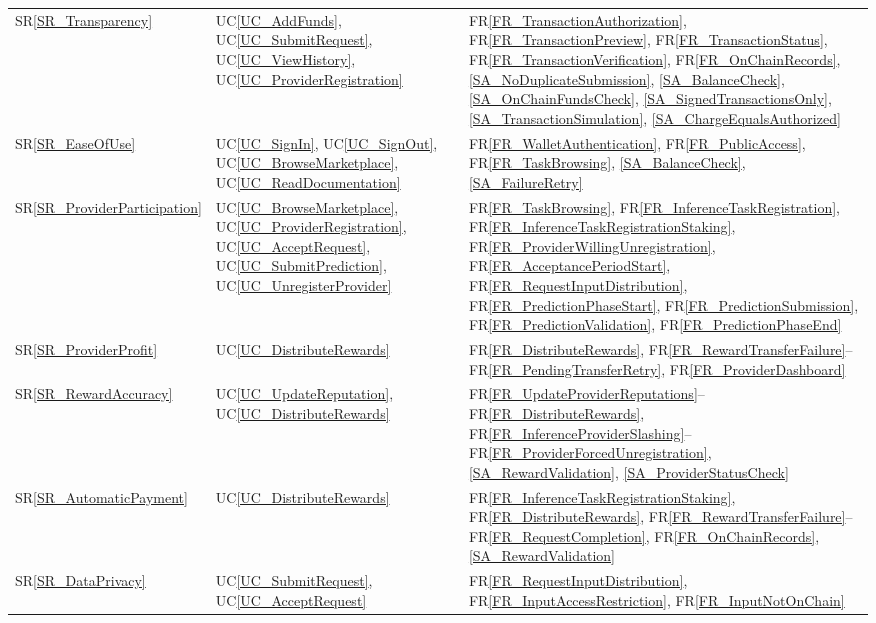 \documentclass[12pt]{article}
\newcommand{\srref}[1]{SR\ref{#1}}
\newcommand{\ucref}[1]{UC\ref{#1}}
\newcommand{\rref}[1]{FR\ref{#1}}
\begin{document}
\begin{longtable}{p{} p{} p{}}
\srref{SR_Transparency} & \ucref{UC_AddFunds}, \ucref{UC_SubmitRequest}, \ucref{UC_ViewHistory}, \ucref{UC_ProviderRegistration}
  & \rref{FR_TransactionAuthorization}, \rref{FR_TransactionPreview}, \rref{FR_TransactionStatus}, \rref{FR_TransactionVerification}, \rref{FR_OnChainRecords}, \ref{SA_NoDuplicateSubmission}, \ref{SA_BalanceCheck}, \ref{SA_OnChainFundsCheck}, \ref{SA_SignedTransactionsOnly}, \ref{SA_TransactionSimulation}, \ref{SA_ChargeEqualsAuthorized} \\[0.5em]

\srref{SR_EaseOfUse} & \ucref{UC_SignIn}, \ucref{UC_SignOut}, \ucref{UC_BrowseMarketplace}, \ucref{UC_ReadDocumentation}
  & \rref{FR_WalletAuthentication}, \rref{FR_PublicAccess}, \rref{FR_TaskBrowsing}, \ref{SA_BalanceCheck}, \ref{SA_FailureRetry} \\[0.5em]

\srref{SR_ProviderParticipation} & \ucref{UC_BrowseMarketplace}, \ucref{UC_ProviderRegistration}, \ucref{UC_AcceptRequest}, \ucref{UC_SubmitPrediction}, \ucref{UC_UnregisterProvider}
  & \rref{FR_TaskBrowsing}, \rref{FR_InferenceTaskRegistration}, \rref{FR_InferenceTaskRegistrationStaking}, \rref{FR_ProviderWillingUnregistration}, \rref{FR_AcceptancePeriodStart}, \rref{FR_RequestInputDistribution}, \rref{FR_PredictionPhaseStart}, \rref{FR_PredictionSubmission}, \rref{FR_PredictionValidation}, \rref{FR_PredictionPhaseEnd} \\[0.5em]

\srref{SR_ProviderProfit} & \ucref{UC_DistributeRewards}
  & \rref{FR_DistributeRewards}, \rref{FR_RewardTransferFailure}--\rref{FR_PendingTransferRetry}, \rref{FR_ProviderDashboard} \\[0.5em]

\srref{SR_RewardAccuracy} & \ucref{UC_UpdateReputation}, \ucref{UC_DistributeRewards}
  & \rref{FR_UpdateProviderReputations}--\rref{FR_DistributeRewards}, \rref{FR_InferenceProviderSlashing}--\rref{FR_ProviderForcedUnregistration}, \ref{SA_RewardValidation}, \ref{SA_ProviderStatusCheck} \\[0.5em]

\srref{SR_AutomaticPayment} & \ucref{UC_DistributeRewards}
  & \rref{FR_InferenceTaskRegistrationStaking}, \rref{FR_DistributeRewards}, \rref{FR_RewardTransferFailure}--\rref{FR_RequestCompletion}, \rref{FR_OnChainRecords}, \ref{SA_RewardValidation} \\[0.5em]

\srref{SR_DataPrivacy} & \ucref{UC_SubmitRequest}, \ucref{UC_AcceptRequest}
  & \rref{FR_RequestInputDistribution}, \rref{FR_InputAccessRestriction}, \rref{FR_InputNotOnChain} \\[0.5em]


\end{longtable}
\end{document}
